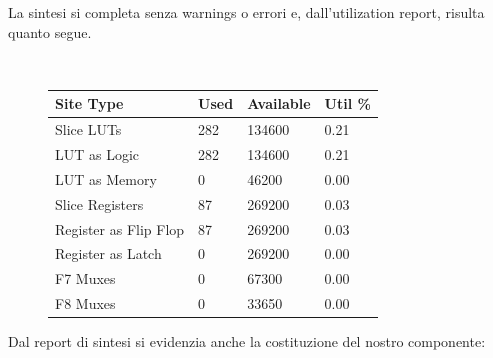\documentclass[11pt]{article}
\begin{document}
    La sintesi si completa senza warnings o errori e, dall'utilization report, risulta quanto segue.
    
    \begin{figure}[h]
        \centering
        \tt
        \begin{tabular}{|l|l|l|l|}
            \hline
            Site Type & Used & Available & Util \% \\
            \hline
            Slice LUTs & 282 & 134600 & 0.21 \\
            \quad LUT as Logic & 282 & 134600 & 0.21 \\
            \quad LUT as Memory & 0 & 46200 & 0.00 \\
            Slice Registers & 87 & 269200 & 0.03 \\
            \quad Register as Flip Flop & 87 & 269200 & 0.03 \\
            \quad Register as Latch & 0 & 269200 & 0.00 \\
            F7 Muxes & 0 & 67300 & 0.00 \\
            F8 Muxes & 0 & 33650 & 0.00 \\
            \hline
        \end{tabular}
    \end{figure}
    Dal report di sintesi si evidenzia anche la costituzione del nostro componente:
\end{document}
